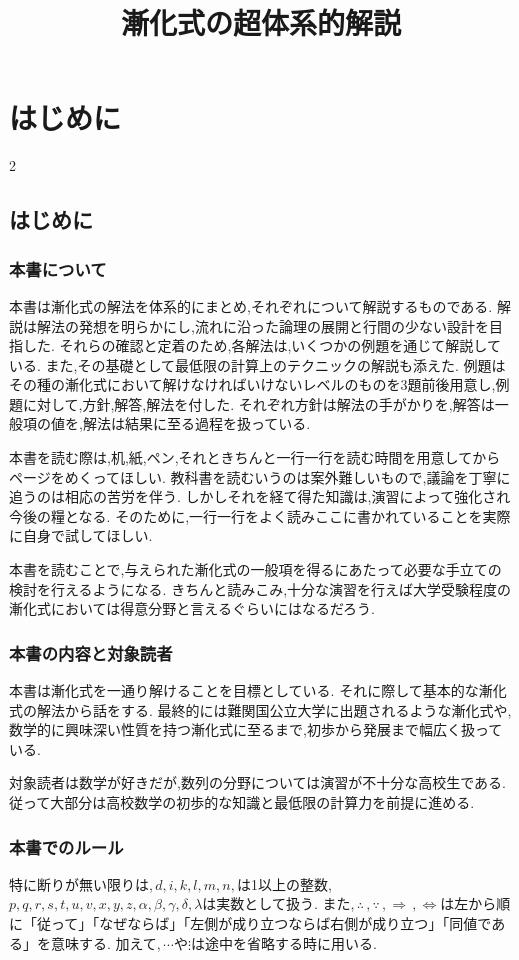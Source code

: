 \documentclass[dvipdfmx,a4paper,11pt,fleqn,openany]{jsbook}
\title{漸化式の超体系的解説}
\begin{document}
\date{}
\author{}
\maketitle

\tableofcontents
\pagebreak
\chapter{はじめに}
\begin{multicols*}{2}
  \section{はじめに}
    \subsection{本書について}
      本書は漸化式の解法を体系的にまとめ,それぞれについて解説するものである.
      解説は解法の発想を明らかにし,流れに沿った論理の展開と行間の少ない設計を目指した.
      それらの確認と定着のため,各解法は,いくつかの例題を通じて解説している.
      また,その基礎として最低限の計算上のテクニックの解説も添えた.
      例題はその種の漸化式において解けなければいけないレベルのものを3題前後用意し,例題に対して,方針,解答,解法を付した.
      それぞれ方針は解法の手がかりを,解答は一般項の値を,解法は結果に至る過程を扱っている.

      本書を読む際は,机,紙,ペン,それときちんと一行一行を読む時間を用意してからページをめくってほしい.
      教科書を読むいうのは案外難しいもので,議論を丁寧に追うのは相応の苦労を伴う.
      しかしそれを経て得た知識は,演習によって強化され今後の糧となる.
      そのために,一行一行をよく読みここに書かれていることを実際に自身で試してほしい.

      本書を読むことで,与えられた漸化式の一般項を得るにあたって必要な手立ての検討を行えるようになる.
      きちんと読みこみ,十分な演習を行えば大学受験程度の漸化式においては得意分野と言えるぐらいにはなるだろう.     

    \subsection{本書の内容と対象読者}
      本書は漸化式を一通り解けることを目標としている.
      それに際して基本的な漸化式の解法から話をする.
      最終的には難関国公立大学に出題されるような漸化式や,数学的に興味深い性質を持つ漸化式に至るまで,初歩から発展まで幅広く扱っている.
      
      対象読者は数学が好きだが,数列の分野については演習が不十分な高校生である.
      従って大部分は高校数学の初歩的な知識と最低限の計算力を前提に進める.

    \subsection{本書でのルール}
      特に断りが無い限りは,\,$d,i,k,l,m,n,$は1以上の整数,\,$p,q,r,s,t,u,v,x,y,z,\alpha,\beta,\gamma,\delta,\lambda$は実数として扱う.
      また,\,$\therefore\,,\because\,,\Rightarrow\,,\Leftrightarrow$は左から順に「従って」「なぜならば」「左側が成り立つならば右側が成り立つ」「同値である」を意味する.
      加えて,\,$\cdots$や$\vdots$は途中を省略する時に用いる.

\end{multicols*}
\end{document}
